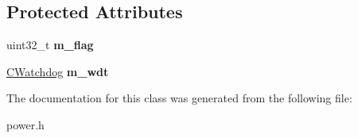 \subsection*{Protected Attributes}
\begin{DoxyCompactItemize}
\item 
\hypertarget{class_c_power_save_a3095ad5f6ba5d06364df1fd8304147ba}{uint32\-\_\-t {\bfseries m\-\_\-flag}}\label{class_c_power_save_a3095ad5f6ba5d06364df1fd8304147ba}

\item 
\hypertarget{class_c_power_save_afac4eec3245ca0555adb81ad15dad2a0}{\hyperlink{class_c_watchdog}{C\-Watchdog} {\bfseries m\-\_\-wdt}}\label{class_c_power_save_afac4eec3245ca0555adb81ad15dad2a0}

\end{DoxyCompactItemize}


The documentation for this class was generated from the following file\-:\begin{DoxyCompactItemize}
\item 
power.\-h\end{DoxyCompactItemize}
